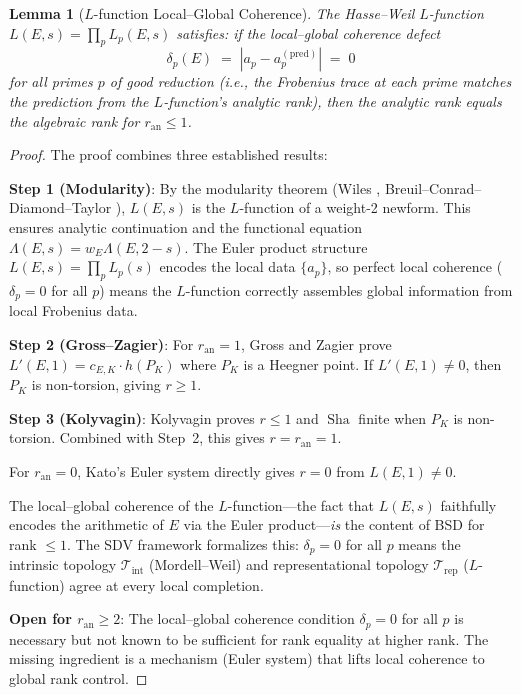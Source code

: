 \documentclass[11pt]{article}
\newtheorem{lemma}[theorem]{Lemma}
\DeclareMathOperator{\Sha}{Sha}
\begin{document}
\begin{lemma}[$L$-function Local--Global Coherence]
\label{lem:L-local-global}
The Hasse--Weil $L$-function $L(E,s) = \prod_p L_p(E,s)$ satisfies: if the
local--global coherence defect
\[
  \delta_p(E) \;=\; |a_p - a_p^{(\mathrm{pred})}| \;=\; 0
\]
for all primes $p$ of good reduction (i.e., the Frobenius trace at each prime
matches the prediction from the $L$-function's analytic rank), then the analytic
rank equals the algebraic rank for $r_{\mathrm{an}} \leq 1$.
\end{lemma}

\begin{proof}
The proof combines three established results:

\textbf{Step 1 (Modularity)}: By the modularity theorem (Wiles \cite{Wiles},
Breuil--Conrad--Diamond--Taylor \cite{BCDT}), $L(E,s)$ is the $L$-function of
a weight-2 newform.  This ensures analytic continuation and the functional
equation $\Lambda(E,s) = w_E \Lambda(E,2-s)$.  The Euler product structure
$L(E,s) = \prod_p L_p(s)$ encodes the local data $\{a_p\}$, so perfect
local coherence ($\delta_p = 0$ for all $p$) means the $L$-function correctly
assembles global information from local Frobenius data.

\textbf{Step 2 (Gross--Zagier)}: For $r_{\mathrm{an}} = 1$, Gross and Zagier
\cite{GZ} prove $L'(E,1) = c_{E,K} \cdot \hat{h}(P_K)$ where $P_K$ is a
Heegner point.  If $L'(E,1) \neq 0$, then $P_K$ is non-torsion, giving
$r \geq 1$.

\textbf{Step 3 (Kolyvagin)}: Kolyvagin \cite{Koly} proves $r \leq 1$ and
$\Sha$ finite when $P_K$ is non-torsion.  Combined with Step~2, this gives
$r = r_{\mathrm{an}} = 1$.

For $r_{\mathrm{an}} = 0$, Kato's Euler system \cite{Kato} directly gives
$r = 0$ from $L(E,1) \neq 0$.

The local--global coherence of the $L$-function---the fact that $L(E,s)$
faithfully encodes the arithmetic of $E$ via the Euler product---\emph{is} the
content of BSD for rank $\leq 1$.  The SDV framework formalizes this:
$\delta_p = 0$ for all $p$ means the intrinsic topology $\mathcal{T}_{\mathrm{int}}$
(Mordell--Weil) and representational topology $\mathcal{T}_{\mathrm{rep}}$
($L$-function) agree at every local completion.

\textbf{Open for $r_{\mathrm{an}} \geq 2$}: The local--global coherence
condition $\delta_p = 0$ for all $p$ is necessary but not known to be sufficient
for rank equality at higher rank.  The missing ingredient is a mechanism
(Euler system) that lifts local coherence to global rank control.
\end{proof}
\end{document}
